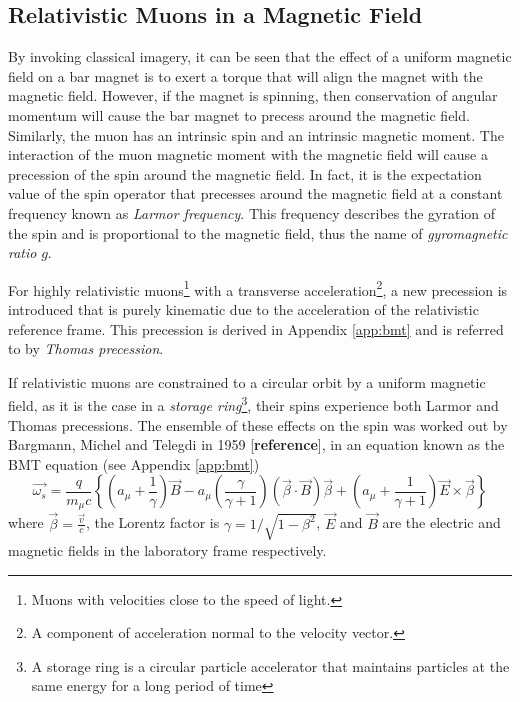 \documentclass{outhesis}
\begin{document}
\subsection{Relativistic Muons in a Magnetic Field}

By invoking classical imagery, it can be seen that the effect of a uniform magnetic field on a bar magnet is to exert a torque that will align the magnet with the magnetic field. However, if the magnet is spinning, then conservation of angular momentum will cause the bar magnet to precess around the magnetic field. Similarly, the muon has an intrinsic spin and an intrinsic magnetic moment. The interaction of the muon magnetic moment with the magnetic field will cause a precession of the spin around the magnetic field. In fact, it is the expectation value of the spin operator
that precesses around the magnetic field at a constant frequency known as \emph{Larmor frequency}. 
This frequency describes the gyration of the spin and is proportional to the magnetic field, thus the name of \emph{gyromagnetic ratio} $g$. 


For highly relativistic muons\footnote{Muons with velocities close to the speed of light.} with a transverse acceleration\footnote{A component of acceleration normal to the velocity vector.}, a new precession is introduced that is purely kinematic due to the acceleration of the relativistic reference frame. This precession is derived in Appendix \ref{app:bmt} and is referred to by \emph{Thomas precession}.

If relativistic muons are constrained to a circular orbit by a uniform magnetic field, as it is the case in a \emph{storage ring}\footnote{A storage ring is a circular particle accelerator that maintains particles at the same energy for a long period of time}, their spins experience both Larmor and Thomas precessions. The ensemble of these effects on the spin was worked out by Bargmann, Michel and Telegdi in 1959 [\textbf{reference}], in an equation known as the BMT equation (see Appendix \ref{app:bmt})
\begin{equation}
\overrightarrow{\omega_s} =  \frac{q}{m_{\mu}c}\left\{\left(a_{\mu} + \frac{1}{\gamma}\right)\overrightarrow{B}    -   a_{\mu}\left(\frac{\gamma}{\gamma + 1}\right)\left(\overrightarrow{\beta} \cdot \overrightarrow{B}\right)\overrightarrow{\beta}   +   \left(a_{\mu}+\frac{1}{\gamma + 1}\right)\overrightarrow{E} \times\overrightarrow{\beta}                 \right\}
\end{equation}
where $\overrightarrow{\beta} = \frac{\overrightarrow{v} }{c}$, the Lorentz factor is $\gamma = 1/\sqrt{1-\beta^2}$, $\overrightarrow{E}$ and $\overrightarrow{B} $ are the electric and magnetic fields in the laboratory frame respectively.
\end{document}
